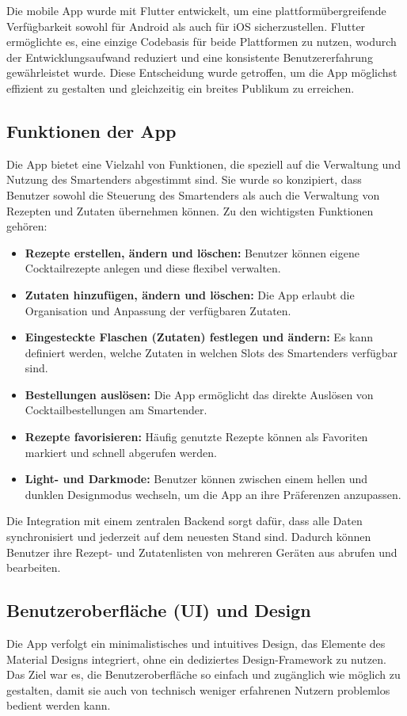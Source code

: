 Die mobile App wurde mit Flutter entwickelt, um eine plattformübergreifende Verfügbarkeit sowohl für Android als auch für iOS sicherzustellen. Flutter ermöglichte es, eine einzige Codebasis für beide Plattformen zu nutzen, wodurch der Entwicklungsaufwand reduziert und eine konsistente Benutzererfahrung gewährleistet wurde. Diese Entscheidung wurde getroffen, um die App möglichst effizient zu gestalten und gleichzeitig ein breites Publikum zu erreichen.

\subsection{Funktionen der App}
Die App bietet eine Vielzahl von Funktionen, die speziell auf die Verwaltung und Nutzung des Smartenders abgestimmt sind. Sie wurde so konzipiert, dass Benutzer sowohl die Steuerung des Smartenders als auch die Verwaltung von Rezepten und Zutaten übernehmen können. Zu den wichtigsten Funktionen gehören:

\begin{itemize}
    \item \textbf{Rezepte erstellen, ändern und löschen:} Benutzer können eigene Cocktailrezepte anlegen und diese flexibel verwalten.
    \item \textbf{Zutaten hinzufügen, ändern und löschen:} Die App erlaubt die Organisation und Anpassung der verfügbaren Zutaten.
    \item \textbf{Eingesteckte Flaschen (Zutaten) festlegen und ändern:} Es kann definiert werden, welche Zutaten in welchen Slots des Smartenders verfügbar sind.
    \item \textbf{Bestellungen auslösen:} Die App ermöglicht das direkte Auslösen von Cocktailbestellungen am Smartender.
    \item \textbf{Rezepte favorisieren:} Häufig genutzte Rezepte können als Favoriten markiert und schnell abgerufen werden.
    \item \textbf{Light- und Darkmode:} Benutzer können zwischen einem hellen und dunklen Designmodus wechseln, um die App an ihre Präferenzen anzupassen.
\end{itemize}
Die Integration mit einem zentralen Backend sorgt dafür, dass alle Daten synchronisiert und jederzeit auf dem neuesten Stand sind. Dadurch können Benutzer ihre Rezept- und Zutatenlisten von mehreren Geräten aus abrufen und bearbeiten.

\subsection{Benutzeroberfläche (UI) und Design}
Die App verfolgt ein minimalistisches und intuitives Design, das Elemente des Material Designs integriert, ohne ein dediziertes Design-Framework zu nutzen. Das Ziel war es, die Benutzeroberfläche so einfach und zugänglich wie möglich zu gestalten, damit sie auch von technisch weniger erfahrenen Nutzern problemlos bedient werden kann.

